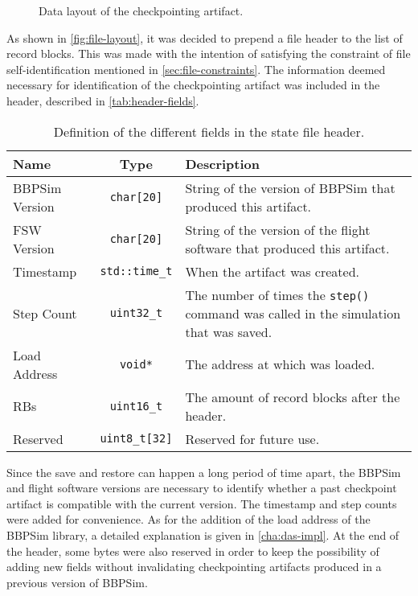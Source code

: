 {\begin{figure}[h]
	\vspace{6pt}
	\centering
	\small
	
	\caption{Data layout of the checkpointing artifact.}
	\label{fig:file-layout}
\end{figure}

As shown in \autoref{fig:file-layout}, it was decided to prepend a file header to the list of record blocks. This was made with the intention of satisfying the constraint of file self-identification mentioned in \autoref{sec:file-constraints}. The information deemed necessary for identification of the checkpointing artifact was included in the header, described in \autoref{tab:header-fields}.
\begin{table}[h]
	\vspace{12pt}
	\centering
	\begin{tabularx}{\linewidth}{l c X}
		\toprule
		{\bfseries Name}&{\bfseries \Cpp Type}&{\bfseries Description}\\
		\midrule
		BBPSim Version & \texttt{char[20]} & String of the version of BBPSim that produced this artifact.\\
		\midrule
		FSW Version & \texttt{char[20]} & String of the version of the flight software that produced this artifact.\\
		\midrule
		Timestamp & \texttt{std::time_t} & When the artifact was created.\\
		\midrule
		Step Count & \texttt{uint32_t} & The number of times the \texttt{step()} command was called in the simulation that was saved.\\
		\midrule
		Load Address & \texttt{void*} & The address at which \pathmono{libBbpSim.so} was loaded.\\
		\midrule
		RBs & \texttt{uint16_t} & The amount of record blocks after the header.\\
		\midrule
		Reserved & \texttt{uint8_t[32]} & Reserved for future use.\\
		\bottomrule	
	\end{tabularx}
	\caption{Definition of the different fields in the state file header.}
	\label{tab:header-fields}
\end{table}

Since the save and restore can happen a long period of time apart, the BBPSim and flight software versions are necessary to identify whether a past checkpoint artifact is compatible with the current version. The timestamp and step counts were added for convenience. As for the addition of the load address of the BBPSim library, a detailed explanation is given in \autoref{cha:das-impl}. At the end of the header, some bytes were also reserved in order to keep the possibility of adding new fields without invalidating checkpointing artifacts produced in a previous version of BBPSim.

}